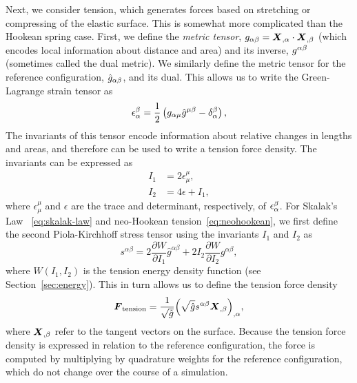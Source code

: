 Next, we consider tension, which generates forces based on stretching or compressing of the elastic surface. This is somewhat more complicated than the Hookean spring case. First, we define the \emph{metric
tensor}, $g_{\alpha\beta} = \boldsymbol{X}_{,\alpha}\cdot\boldsymbol{X}_{,\beta}$  (which encodes local
information about distance and area) and its inverse, $g^{\alpha\beta}$ (sometimes called the dual metric). We similarly define the metric tensor for the reference
configuration, $\hat{g}_{\alpha\beta}$, and its dual. This allows us to write the Green-Lagrange strain tensor as
\begin{equation}
    \epsilon_\alpha^\beta = \frac12\left(g_{\alpha\mu}\hat{g}^{\mu\beta}-\delta_\alpha^\beta\right),
\end{equation}
The invariants of this tensor encode information about relative changes in lengths and areas, and therefore can be used to write a tension force density. The invariants can be expressed as
\begin{align}
I_1 &= 2\epsilon_\mu^\mu, \\ 
I_2 &= 4\epsilon + I_1,
\end{align}
where $\epsilon_\mu^\mu$ and $\epsilon$ are the trace and determinant, respectively, of $\epsilon_\alpha^{\smash\beta}$. For Skalak's Law~%
\eqref{eq:skalak-law} and neo-Hookean tension~\eqref{eq:neohookean}, we first define the second Piola-Kirchhoff stress tensor using the invariants $I_1$ and $I_2$ as
\begin{equation}
s^{\alpha\beta} = 2\frac{\partial W}{\partial I_1} \hat{g}^{\alpha\beta} + 2I_2\frac{\partial W}{\partial I_2} g^{\alpha\beta},
\end{equation}
where $W(I_1,I_2)$ is the tension energy density function (see Section~\ref{sec:energy}). This in turn allows us to define the tension force density~\cite{Maxian:2018ek}
\begin{equation}\label{eq:tension-force}
    \boldsymbol{F}_\text{tension} = \frac{1}{\sqrt{\hat{g}}}{\left(\sqrt{\hat{g}}s^{\alpha\beta}\boldsymbol{X}_{,\beta}\right)}_{,\alpha},
\end{equation}
where $\boldsymbol{X}_{,\beta}$ refer to the tangent vectors on the surface. Because the tension force density is expressed in relation to the reference
configuration, the force is computed by multiplying by quadrature weights for the
reference configuration, which do not change over the course of a simulation.

